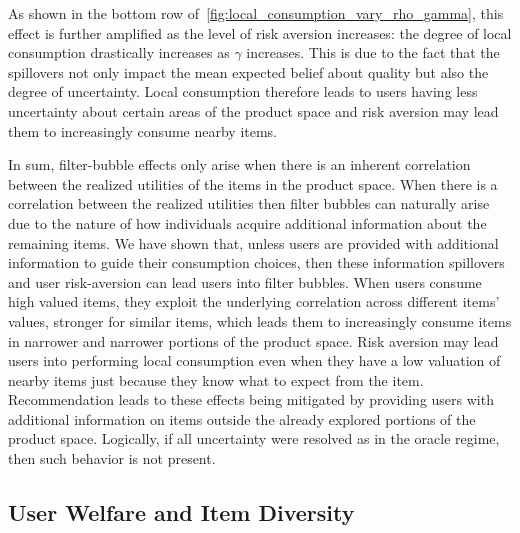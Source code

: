 \documentclass[manuscript, nonacm]{acmart}
\begin{document}
\par
As shown in the bottom row of~\autoref{fig:local_consumption_vary_rho_gamma}, this effect is further amplified as the level of risk aversion increases: the degree of local consumption drastically increases as $\gamma$ increases. This is due to the fact that the spillovers not only impact the mean expected belief about quality but also the degree of uncertainty. Local consumption therefore leads to users having less uncertainty about certain areas of the product space and risk aversion may lead them to increasingly consume nearby items.

In sum, filter-bubble effects only arise when there is an inherent correlation between the realized utilities of the items in the product space. When there is a correlation between the realized utilities then filter bubbles can naturally arise due to the nature of how individuals acquire additional information about the remaining items. We have shown that, unless users are provided with additional information to guide their consumption choices, then these information spillovers and user risk-aversion can lead users into filter bubbles. When users consume high valued items, they exploit the underlying correlation across different items' values, stronger for similar items, which leads them to increasingly consume items in narrower and narrower portions of the product space. Risk aversion may lead users into performing local consumption even when they have a low valuation of nearby items just because they know what to expect from the item. Recommendation leads to these effects being mitigated by providing users with additional information on items outside the already explored portions of the product space. Logically, if all uncertainty were resolved as in the oracle regime, then such behavior is not present.


\subsection{User Welfare and Item Diversity}
\end{document}
